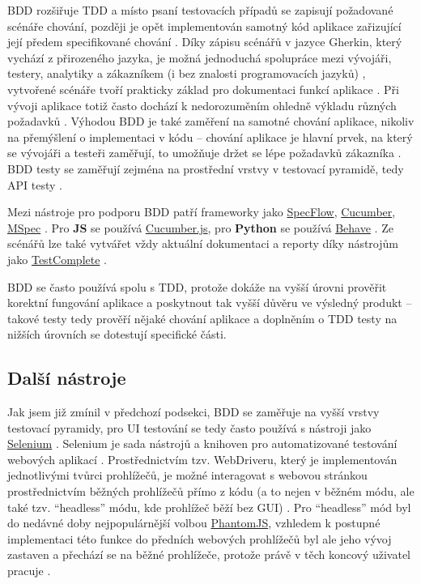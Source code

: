 BDD rozšiřuje TDD a místo psaní testovacích případů se zapisují požadované scénáře chování, později je opět implementován samotný kód aplikace zařizující její předem specifikované chování \cite{test-swtestinghelp2}. Díky zápisu scénářů v jazyce Gherkin, který vychází z přirozeného jazyka, je možná jednoduchá spolupráce mezi vývojáři, testery, analytiky a zákazníkem (i bez znalosti programovacích jazyků) \cite{test-swtestinghelp2, test-cucumber1}, vytvořené scénáře tvoří prakticky základ pro dokumentaci funkcí aplikace \cite{test-smartbear2}. Při vývoji aplikace totiž často dochází k nedorozuměním ohledně výkladu různých požadavků \cite{test-smartbear2}. Výhodou BDD je také zaměření na samotné chování aplikace, nikoliv na přemýšlení o implementaci v kódu -- chování aplikace je hlavní prvek, na který se vývojáři a testeři zaměřují, to umožňuje držet se lépe požadavků zákazníka \cite{test-swtestinghelp2}. BDD testy se zaměřují zejména na prostřední vrstvy v testovací pyramidě, tedy API testy \cite{test-swtestinghelp1}.

Mezi nástroje pro podporu BDD patří frameworky jako \href{https://specflow.org/}{SpecFlow}, \href{https://cucumber.io/}{Cucumber}, \href{https://github.com/machine/machine.specifications}{MSpec} \cite{test-swtestinghelp2}. Pro \textbf{JS} se používá \href{https://cucumber.io/docs/installation/javascript/}{Cucumber.js}, pro \textbf{Python} se používá \href{https://behave.readthedocs.io/en/latest/}{Behave} \cite{test-chart-bdd}. Ze scénářů lze také vytvářet vždy aktuální dokumentaci a reporty díky nástrojům jako \href{https://smartbear.com/product/testcomplete/overview/}{TestComplete} \cite{test-smartbear2}. 

BDD se často používá spolu s TDD, protože dokáže na vyšší úrovni prověřit korektní fungování aplikace a poskytnout tak vyšší důvěru ve výsledný produkt \cite{test-cucumber1} -- takové testy tedy prověří nějaké chování aplikace a doplněním o TDD testy na nižších úrovních se dotestují specifické části.

\subsection{Další nástroje}

Jak jsem již zmínil v předchozí podsekci, BDD se zaměřuje na vyšší vrstvy testovací pyramidy, pro UI testování se tedy často používá s nástroji jako \href{https://www.selenium.dev/}{Selenium} \cite{test-dzone}. Selenium je sada nástrojů a knihoven pro automatizované testování webových aplikací \cite{test-seleniumdocs}. Prostřednictvím tzv. WebDriveru, který je implementován jednotlivými tvůrci prohlížečů, je možné interagovat s webovou stránkou prostřednictvím běžných prohlížečů přímo z kódu (a to nejen v běžném módu, ale také tzv. \enquote{headless} módu, kde prohlížeč běží bez GUI) \cite{test-hackernoon1, test-seleniumdocs}. Pro \enquote{headless} mód byl do nedávné doby nejpopulárnější volbou \href{https://phantomjs.org/}{PhantomJS}, vzhledem k postupné implementaci této funkce do předních webových prohlížečů byl ale jeho vývoj zastaven a přechází se na běžné prohlížeče, protože právě v těch koncový uživatel pracuje \cite{test-fowler, test-phantomjs}.

